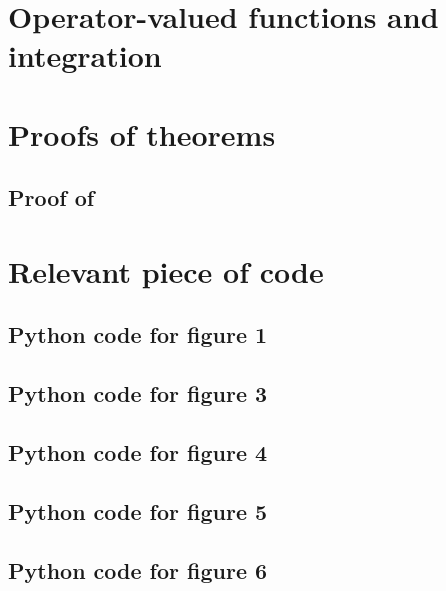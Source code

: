 
\chapter{Operator-valued functions and integration}
\label{ch:operator-valued_functions_and_integration}

\chapter{Proofs of theorems}
\label{ch:proof_of_theorems}
\section{Proof of }

\chapter{Relevant piece of code}
\label{ch:relevant_piece_of_code}
\section{Python code for figure 1}
{\scriptsize
{}}

\section{Python code for figure 3}
{\scriptsize
{}}

\section{Python code for figure 4}
\label{code:efficient_decomposable_gaussian}
{\scriptsize
{}}


\section{Python code for figure 5}
\label{code:efficient_curlfree_gaussian}
{\scriptsize
{}}

\section{Python code for figure 6}
\label{code:efficient_divfree_gaussian}
{\scriptsize
{}}


